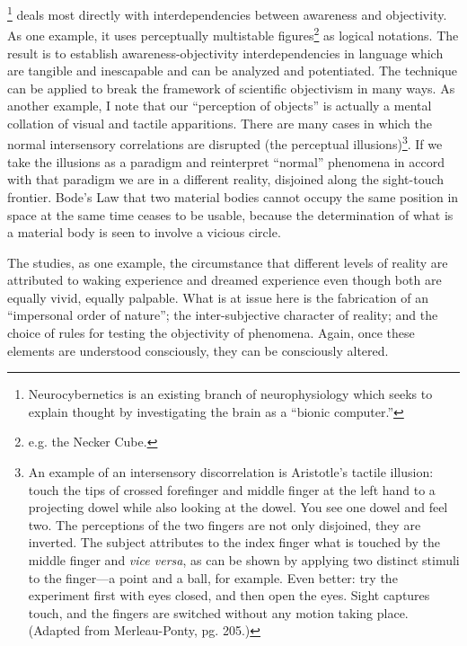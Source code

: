 \footnote{Neurocybernetics is an existing branch
of neurophysiology which seeks to explain thought by investigating the brain as a
\enquote{bionic computer.}} deals most directly with interdependencies between 
awareness and objectivity. As one example, it uses perceptually multistable 
figures\footnote{e.g. the Necker Cube. \cubeframe} as logical notations. The 
result is to establish awareness-objectivity interdependencies in language which 
are tangible and inescapable and can be analyzed and potentiated. The technique 
can be applied to break the framework of scientific objectivism in many ways. As 
another example, I note that our \enquote{perception of objects} is actually a 
mental collation of visual and tactile apparitions. There are many cases in which 
the normal intersensory correlations are disrupted (the perceptual illusions)\footnote{
An example of an intersensory discorrelation is Aristotle's tactile illusion: touch
the tips of crossed forefinger and middle finger at the left hand to a projecting dowel
while also looking at the dowel. You see one dowel and feel two. The perceptions of the
two fingers are not only disjoined, they are inverted. The subject attributes to the
index finger what is touched by the middle finger and \textit{vice versa}, as can be
shown by applying two distinct stimuli to the finger---a point and a ball, for example.
Even better: try the experiment first with eyes closed, and then open the eyes. Sight
captures touch, and the fingers are switched without any motion taking place. (Adapted
from Merleau-Ponty,  pg. 205.)}. If we
take the illusions as a paradigm and reinterpret \enquote{normal} 
phenomena in accord with that paradigm we are in a different reality, disjoined 
along the sight-touch frontier. Bode's Law that two material bodies cannot occupy 
the same position in space at the same time ceases to be usable, because the 
determination of what is a material body is seen to involve a vicious circle. 

The  studies, as one example, the circumstance 
that different levels of reality are attributed to waking experience and dreamed 
experience even though both are equally vivid, equally palpable. What is at issue 
here is the fabrication of an \enquote{impersonal order of nature}; the inter-subjective 
character of reality; and the choice of rules for testing the objectivity of phenomena. 
Again, once these elements are understood consciously, they can be consciously 
altered. 

